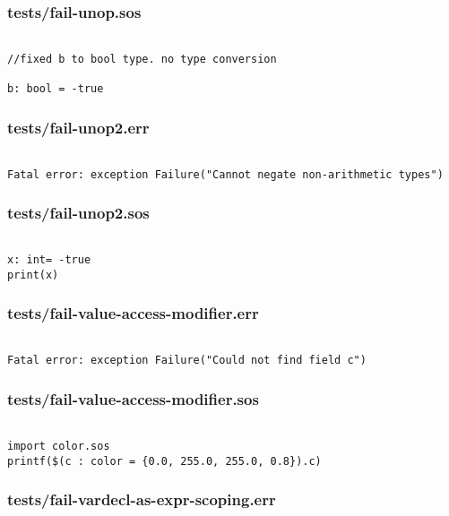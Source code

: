 \documentclass[main.tex]{subfiles}
\begin{document}
\subsubsection{tests/fail-unop.sos}

\begin{lstlisting}

//fixed b to bool type. no type conversion

b: bool = -true
\end{lstlisting}

\subsubsection{tests/fail-unop2.err}

\begin{lstlisting}

Fatal error: exception Failure("Cannot negate non-arithmetic types")
\end{lstlisting}

\subsubsection{tests/fail-unop2.sos}

\begin{lstlisting}

x: int= -true
print(x)
\end{lstlisting}

\subsubsection{tests/fail-value-access-modifier.err}

\begin{lstlisting}

Fatal error: exception Failure("Could not find field c")
\end{lstlisting}

\subsubsection{tests/fail-value-access-modifier.sos}

\begin{lstlisting}

import color.sos
printf($(c : color = {0.0, 255.0, 255.0, 0.8}).c)\end{lstlisting}

\subsubsection{tests/fail-vardecl-as-expr-scoping.err}
\end{document}
